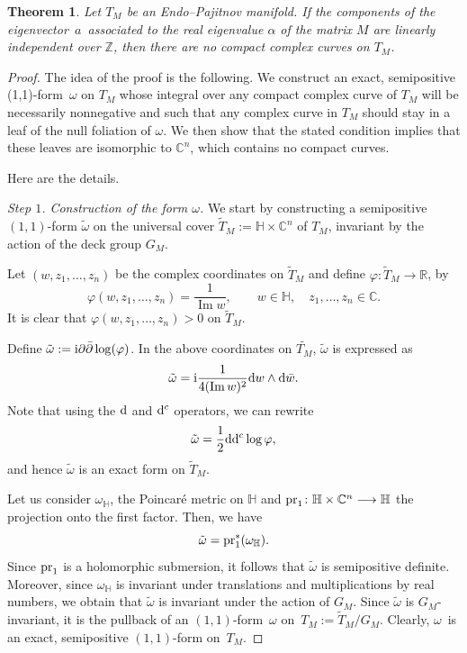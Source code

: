 \documentclass[10pt,a4paper]{amsart}
\newcommand{\C}{{\mathbb C}}
\renewcommand{\H}{{\mathbb H}}
\newcommand{\6}{\partial}
\renewcommand{\Im}{\operatorname{Im}}
\numberwithin{equation}{section}
\newtheorem{Theorem}{Theorem}[section]
\begin{document}
\begin{Theorem}\label{th_main}
Let $T_M$ be an Endo--Pajitnov manifold. If the components of the eigenvector~$a$~associated to the real eigenvalue $\alpha$ of the matrix $M$ are linearly independent over $\mathbb{Z}$, then there are no compact complex curves on $T_M$.
\end{Theorem}


\begin{proof}
The idea of the proof is the following. We construct an exact, semipositive (1,1)-form~$\omega$ on $T_M$ whose integral over any compact complex curve of $T_M$ will be necessarily nonnegative and such that any complex curve in $T_M$ should stay in a leaf of the null foliation of $\omega$. We then show that the stated condition implies that these leaves are isomorphic to $\mathbb{C}^n$, which contains no compact curves.

Here are the details.

{\it Step $1$. Construction of the form $\omega$.} We start by constructing a semipositive $(1,1)$-form $\tilde \omega$ on the universal cover $\tilde T_M:=\mathbb{H} \times \mathbb{C}^n$ of $T_M$, invariant by the action of the deck group $G_M$.

Let $(w, z_1, \dots, z_n)$ be the complex coordinates on $\tilde T_M$ and define $\varphi\colon \tilde T_M \longrightarrow \mathbb{R}$, by
\begin{equation*}
\varphi(w,z_1, \dots, z_n)=\frac{1}{\Im w}, \qquad w \in \mathbb{H}, \quad z_1, \dots, z_n \in \mathbb{C}.
\end{equation*}
It is clear that $\varphi(w,z_1, \dots, z_n)>0$ on $\tilde T_M $.

Define $\tilde{\omega}:=\mathrm{i} \6\Bar{\6} \log(\varphi)$.
In the above coordinates on $\tilde{T_M}$, $\tilde \omega$ is expressed as
\[\tilde{\omega}=\mathrm{i} \frac{1}{4(\Im w)^2} {\rm d}w \wedge {\rm d}\Bar{w}.\]
Note that using the ${\rm d}$ and ${\rm d}^c$ operators, we can rewrite
\[\tilde{\omega}=\frac{1}{2}{\rm d} {\rm d}^c \log \varphi,\]
and hence $\tilde{\omega}$ is an exact form on $\tilde T_M$.

Let us consider $\omega_\H$, the Poincar\'e metric on $\H$ and ${\rm pr}_1\colon \H \times \C^n \longrightarrow \H$ the projection onto the first factor. Then, we have
\begin{equation*}
 \tilde \omega={\rm pr}_1^*(\omega_\H).
\end{equation*}
Since ${\rm pr}_1$ is a holomorphic submersion, it follows that $\tilde \omega$ is semipositive definite.
Moreover, since $\omega_\H$ is invariant under translations and multiplications by real numbers, we obtain that $\tilde \omega$ is invariant under the action of $G_M$.
 Since $\tilde{\omega}$ is $G_M$-invariant, it is the pullback of an $(1,1)$-form~$\omega$ on~$T_M:= \tilde T_M/G_M$. Clearly, $\omega$~is an exact, semipositive $(1,1)$-form on~$T_M$.



\end{proof}
\end{document}
